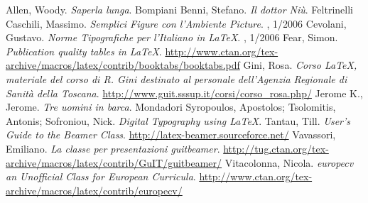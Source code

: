 \documentclass[a4paper,12pt]{article}
\begin{document}
\begin{thebibliography}{666}
	Allen, Woody.
	\newblock \textit{Saperla lunga}.
	\newblock Bompiani
	Benni, Stefano.
	\newblock \textit{Il dottor Ni\`u}.
	\newblock Feltrinelli
	Caschili, Massimo.
	\newblock \textit{Semplici Figure con l'Ambiente Picture}.
	\newblock  \Ars, 1/2006
	Cevolani, Gustavo.
	\newblock \textit{Norme Tipografiche per l'Italiano in \LaTeX}.
	\newblock \Ars, 1/2006
	Fear, Simon.
	\newblock \textit{Publication quality tables in \LaTeX}.
	\newblock \url{http://www.ctan.org/tex-archive/macros/latex/contrib/booktabs/booktabs.pdf}
	Gini, Rosa.
	\newblock\textit{Corso \LaTeX, materiale del corso di R. Gini destinato al personale dell'Agenzia Regionale di Sanit\`a della Toscana}.
	\newblock \url{http://www.guit.sssup.it/corsi/corso\_rosa.php/}
	Jerome K., Jerome.
	\newblock \textit{Tre uomini in barca}.
	\newblock Mondadori
	Syropoulos, Apostolos; Tsolomitis, Antonis; Sofroniou, Nick.
	\newblock \textit{Digital Typography using \LaTeX}.
	Tantau, Till.
	\newblock\textit{User's Guide to the Beamer Class}.
	\newblock \url{http://latex-beamer.sourceforce.net/}
	Vavassori, Emiliano.
	\newblock\textit{La classe per presentazioni \textsf{guitbeamer}}.
	\newblock
	\url{http://tug.ctan.org/tex-archive/macros/latex/contrib/GuIT/guitbeamer/}
	Vitacolonna, Nicola.
	\newblock\textit{europecv an Unofficial Class for European Curricula}.
	\newblock \url{http://www.ctan.org/tex-archive/macros/latex/contrib/europecv/}
\end{thebibliography}
\end{document}
